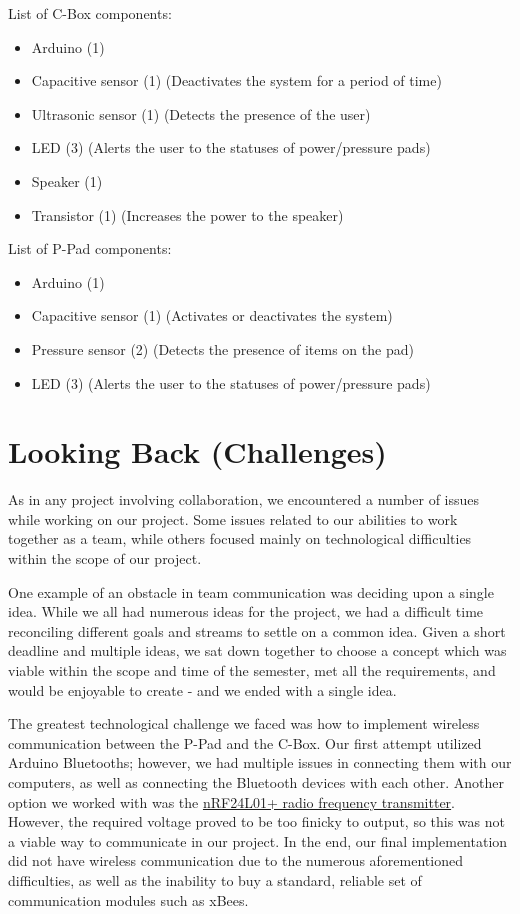 \documentclass[10pt, oneside, letterpaper, titlepage]{article}
\begin{document}
			List of C-Box components:

			\begin{itemize}
				\item Arduino (1)
				\item Capacitive sensor (1) (Deactivates the system for a period of time)
				\item Ultrasonic sensor (1) (Detects the presence of the user)
				\item LED (3) (Alerts the user to the statuses of power/pressure pads)
				\item Speaker (1)
				\item Transistor (1) (Increases the power to the speaker)
			\end{itemize}

			\noindent
			List of P-Pad components:

			\begin{itemize}
				\item Arduino (1)
				\item Capacitive sensor (1) (Activates or deactivates the system)
				\item Pressure sensor (2) (Detects the presence of items on the pad)
				\item LED (3) (Alerts the user to the statuses of power/pressure pads)
			\end{itemize}

	\clearpage
	\section{Looking Back (Challenges)}

		As in any project involving collaboration, we encountered a number of issues while working on our project. Some issues related to our abilities to work together as a team, while others focused mainly on technological difficulties within the scope of our project.

		One example of an obstacle in team communication was deciding upon a single idea. While we all had numerous ideas for the project, we had a difficult time reconciling different goals and streams to settle on a common idea. Given a short deadline and multiple ideas, we sat down together to choose a concept which was viable within the scope and time of the semester, met all the requirements, and would be enjoyable to create - and we ended with a single idea.

		The greatest technological challenge we faced was how to implement wireless communication between the P-Pad and the C-Box. Our first attempt utilized Arduino Bluetooths; however, we had multiple issues in connecting them with our computers, as well as connecting the Bluetooth devices with each other. Another option we worked with was the \href{https://arduino-info.wikispaces.com/Nrf24L01-2.4GHz-HowTo}{nRF24L01+ radio frequency transmitter}. However, the required voltage proved to be too finicky to output, so this was not a viable way to communicate in our project. In the end, our final implementation did not have wireless communication due to the numerous aforementioned difficulties, as well as the inability to buy a standard, reliable set of communication modules such as xBees.
\end{document}
